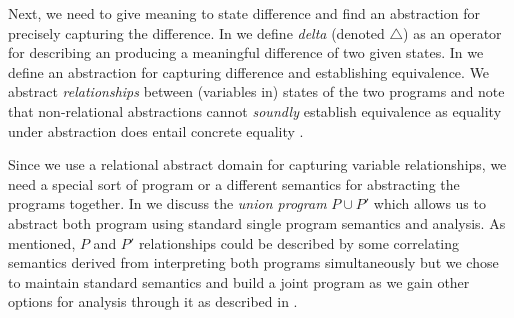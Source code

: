 Next, we need to give meaning to state difference and find an abstraction for precisely capturing the difference. In  we define \emph{delta} (denoted $\triangle$) as an operator for describing an producing a meaningful difference of two given states. In  we define an abstraction for capturing difference and establishing equivalence. We abstract \emph{relationships} between (variables in) states of the two programs and note that non-relational abstractions cannot \emph{soundly} establish equivalence as equality under abstraction does entail concrete equality .

Since we use a relational abstract domain for capturing variable relationships, we need a special sort of program or a different semantics for abstracting the programs together. In  we discuss the \emph{union program} $P \cup P'$ which allows us to abstract both program using standard single program semantics and analysis. As mentioned, $P$ and $P'$ relationships could be described by some correlating semantics derived from interpreting both programs simultaneously but we chose to maintain standard semantics and build a joint program as we gain other options for analysis through it as described in \subref{}.

